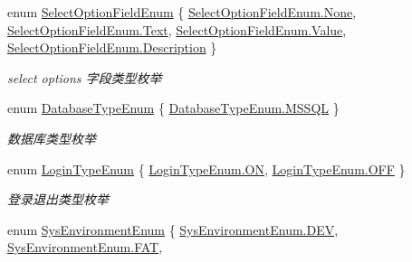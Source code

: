\begin{DoxyCompactItemize}
enum \hyperlink{class_x_c_l_net_tools_1_1_enum_1_1_common_enum_afe1323cff3b78e93907bf636697b2b59}{Select\-Option\-Field\-Enum} \{ \hyperlink{class_x_c_l_net_tools_1_1_enum_1_1_common_enum_afe1323cff3b78e93907bf636697b2b59a6adf97f83acf6453d4a6a4b1070f3754}{Select\-Option\-Field\-Enum.\-None}, 
\hyperlink{class_x_c_l_net_tools_1_1_enum_1_1_common_enum_afe1323cff3b78e93907bf636697b2b59a9dffbf69ffba8bc38bc4e01abf4b1675}{Select\-Option\-Field\-Enum.\-Text}, 
\hyperlink{class_x_c_l_net_tools_1_1_enum_1_1_common_enum_afe1323cff3b78e93907bf636697b2b59a689202409e48743b914713f96d93947c}{Select\-Option\-Field\-Enum.\-Value}, 
\hyperlink{class_x_c_l_net_tools_1_1_enum_1_1_common_enum_afe1323cff3b78e93907bf636697b2b59ab5a7adde1af5c87d7fd797b6245c2a39}{Select\-Option\-Field\-Enum.\-Description}
 \}
\begin{DoxyCompactList}\small\item\em select options 字段类型枚举 \end{DoxyCompactList}\item 
enum \hyperlink{class_x_c_l_net_tools_1_1_enum_1_1_common_enum_a4c4edc085935542b75e6386cb261ab4b}{Database\-Type\-Enum} \{ \hyperlink{class_x_c_l_net_tools_1_1_enum_1_1_common_enum_a4c4edc085935542b75e6386cb261ab4ba1d37e2cfa8532be01d3f89c76ccfe4a9}{Database\-Type\-Enum.\-M\-S\-S\-Q\-L}
 \}
\begin{DoxyCompactList}\small\item\em 数据库类型枚举 \end{DoxyCompactList}\item 
enum \hyperlink{class_x_c_l_net_tools_1_1_enum_1_1_common_enum_a2d2cb4aef1c5cbc23f73c25b5f0c2948}{Login\-Type\-Enum} \{ \hyperlink{class_x_c_l_net_tools_1_1_enum_1_1_common_enum_a2d2cb4aef1c5cbc23f73c25b5f0c2948a90651ebea9a35ec4e018c8157492e17c}{Login\-Type\-Enum.\-O\-N}, 
\hyperlink{class_x_c_l_net_tools_1_1_enum_1_1_common_enum_a2d2cb4aef1c5cbc23f73c25b5f0c2948a88559a0cfd8250c9d65970cc145c92d4}{Login\-Type\-Enum.\-O\-F\-F}
 \}
\begin{DoxyCompactList}\small\item\em 登录退出类型枚举 \end{DoxyCompactList}\item 
enum \hyperlink{class_x_c_l_net_tools_1_1_enum_1_1_common_enum_a2dff7451b041ff407645f3b3d719e3e2}{Sys\-Environment\-Enum} \{ \hyperlink{class_x_c_l_net_tools_1_1_enum_1_1_common_enum_a2dff7451b041ff407645f3b3d719e3e2abfeddf560ff988c07141df6135a9bfcf}{Sys\-Environment\-Enum.\-D\-E\-V}, 
\hyperlink{class_x_c_l_net_tools_1_1_enum_1_1_common_enum_a2dff7451b041ff407645f3b3d719e3e2a06161379527b8df6b18fca5aa984113a}{Sys\-Environment\-Enum.\-F\-A\-T}, 

\end{DoxyCompactItemize}
